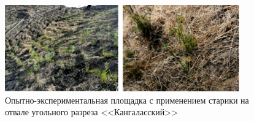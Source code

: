 \begin{figure}
  \begin{center}
    \includegraphics[width=0.9\textwidth]{authors/nekiforov-fig4.jpg}
  \end{center}
  \caption{Опытно-экспериментальная площадка с применением старики на отвале угольного разреза <<Кангаласский>>}
  \label{fig:nekiforov-fig4}
\end{figure}
